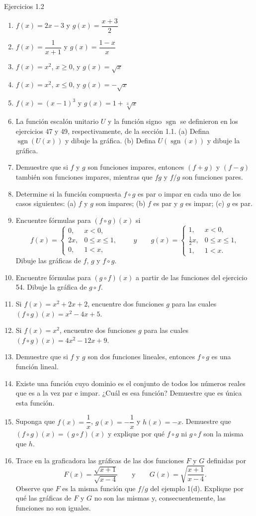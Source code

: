 \documentclass[aspectratio=169,10pt]{beamer}
\begin{document}
\begin{frame}{Ejercicios 1.2}
\begin{enumerate}
\item $f(x)=2x-3$ y $g(x)=\dfrac{x+3}{2}$
\item $f(x)=\dfrac1{x+1}$ y $g(x)=\dfrac{1-x}{x}$
\item $f(x)=x^2$, $x\ge0$, y $g(x)=\sqrt{x}$
\item $f(x)=x^2$, $x\le0$, y $g(x)=-\sqrt{x}$
\item $f(x)=(x-1)^3$ y $g(x)=1+\sqrt[3]{x}$
\item La función escalón unitario $U$ y la función signo $\operatorname{sgn}$ se definieron en los ejercicios 47 y 49, respectivamente, de la sección 1.1. (a) Defina $\operatorname{sgn}(U(x))$ y dibuje la gráfica. (b) Defina $U(\operatorname{sgn}(x))$ y dibuje la gráfica.
\item Demuestre que si $f$ y $g$ son funciones impares, entonces $(f+g)$ y $(f-g)$ también son funciones impares, mientras que $fg$ y $f/g$ son funciones pares.
\item Determine si la función compuesta $f\circ g$ es par o impar en cada uno de los casos siguientes: (a) $f$ y $g$ son impares; (b) $f$ es par y $g$ es impar; (c) $g$ es par.
\item Encuentre fórmulas para $(f\circ g)(x)$ si
\[
f(x)=\begin{cases}0,&x<0,\\2x,&0\le x\le1,\\0,&1<x,\end{cases}
\qquad
y\qquad
g(x)=\begin{cases}1,&x<0,\\\frac12x,&0\le x\le1,\\1,&1<x.\end{cases}
\]
Dibuje las gráficas de $f$, $g$ y $f\circ g$.
\item Encuentre fórmulas para $(g\circ f)(x)$ a partir de las funciones del ejercicio 54. Dibuje la gráfica de $g\circ f$.
\item Si $f(x)=x^2+2x+2$, encuentre dos funciones $g$ para las cuales $(f\circ g)(x)=x^2-4x+5$.
\item Si $f(x)=x^2$, encuentre dos funciones $g$ para las cuales $(f\circ g)(x)=4x^2-12x+9$.
\item Demuestre que si $f$ y $g$ son dos funciones lineales, entonces $f\circ g$ es una función lineal.
\item Existe una función cuyo dominio es el conjunto de todos los números reales que es a la vez par e impar. ¿Cuál es esa función? Demuestre que es única esta función.
\item Suponga que $f(x)=\dfrac1x$, $g(x)=-\dfrac1x$ y $h(x)=-x$. Demuestre que $(f\circ g)(x)=(g\circ f)(x)$ y explique por qué $f\circ g$ ni $g\circ f$ son la misma que $h$.
\item Trace en la graficadora las gráficas de las dos funciones $F$ y $G$ definidas por
\[
F(x)=\frac{\sqrt{x+1}}{\sqrt{x-4}}
\qquad\text{y}\qquad
G(x)=\sqrt{\frac{x+1}{x-4}}.
\]
Observe que $F$ es la misma función que $f/g$ del ejemplo 1(d). Explique por qué las gráficas de $F$ y $G$ no son las mismas y, consecuentemente, las funciones no son iguales.
\end{enumerate}


\end{frame}
\end{document}
